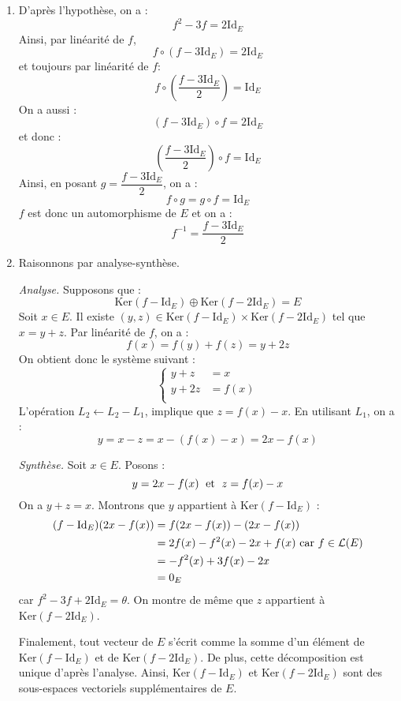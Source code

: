 \documentclass[a4paper,twoside,french,11pt]{VcCours}
\begin{document}
\begin{enumerate}
\item D'après l'hypothèse, on a :
$$ f^2-3f =  2 \textrm{Id}_E$$
Ainsi, par linéarité de $f$,
$$ f \circ (f-3 \textrm{Id}_E) = 2 \textrm{Id}_E$$
et toujours par linéarité de $f$:
$$ f \circ \left( \dfrac{f-3 \textrm{Id}_E}{2} \right) = \textrm{Id}_E$$
On a aussi :
$$ (f- 3 \textrm{Id}_E) \circ f = 2 \textrm{Id}_E$$
et donc :
$$ \left( \dfrac{f-3 \textrm{Id}_E}{2} \right) \circ f = \textrm{Id}_E$$
Ainsi, en posant $g = \dfrac{f-3 \textrm{Id}_E}{2}$, on a :
$$f \circ g = g \circ f = \textrm{Id}_E$$
$f$ est donc un automorphisme de $E$ et on a :
$$ f^{-1} = \dfrac{f-3 \textrm{Id}_E}{2}$$
\item Raisonnons par analyse-synthèse.



\noindent \textit{Analyse.} Supposons que :
$$\textrm{Ker}(f - \textrm{Id}_E) \oplus \textrm{Ker}(f - 2\textrm{Id}_E) = E$$
Soit $x \in E$. Il existe $(y,z) \in \textrm{Ker}(f - \textrm{Id}_E) \times \textrm{Ker}(f - 2\textrm{Id}_E)$ tel que $x=y+z$. Par linéarité de $f$, on a :
$$f(x) = f(y) + f(z) = y+2z$$
On obtient donc le système suivant :
$$ \left\lbrace \begin{array}{rl}
 y+z & = x \\
y+2z & = f(x)\\
\end{array}\right.$$
L'opération $L_2 \leftarrow L_2- L_1$, implique que $z = f(x)-x$. En utilisant $L_1$, on a :
$$ y= x-z = x -(f(x)-x)= 2x-f(x)$$



\noindent \textit{Synthèse.} Soit $x \in E$. Posons :
$$ y= 2x-f(x) \; \hbox{ et } \; z= f(x)-x$$
On a $y+z=x$. Montrons que $y$ appartient à $\textrm{Ker}(f - \textrm{Id}_E)$ :
\begin{align*}
(f - \textrm{Id}_E)(2x-f(x)) & = f(2x-f(x))- (2x-f(x)) \\
& = 2f(x) -f^2(x)-2x+f(x) \hbox{ car } f \in \mathcal{L}(E) \\
& = - f^2(x) +3f(x) -2x \\
& = 0_E
\end{align*}
car $f^2 - 3f + 2 \textrm{Id}_E = \theta$. On montre de même que $z$ appartient à $\textrm{Ker}(f - 2\textrm{Id}_E)$.



\noindent Finalement, tout vecteur de $E$ s'écrit comme la somme d'un élément de $\textrm{Ker}(f - \textrm{Id}_E)$ et de $\textrm{Ker}(f - 2\textrm{Id}_E)$. De plus, cette décomposition est unique d'après l'analyse. Ainsi, $\textrm{Ker}(f - \textrm{Id}_E)$ et $\textrm{Ker}(f - 2\textrm{Id}_E)$ sont des sous-espaces vectoriels supplémentaires de $E$.
\end{enumerate}
\end{document}
